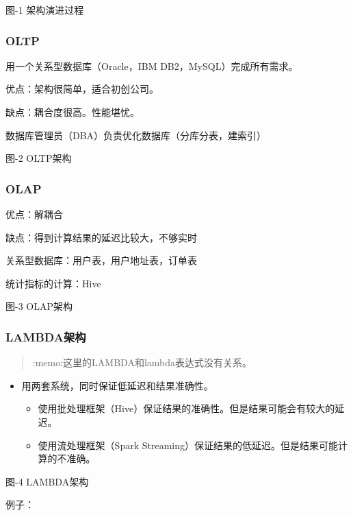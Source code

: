 图-1 架构演进过程

\hypertarget{oltp}{%
\subsubsection{OLTP}\label{oltp}}

用一个关系型数据库（Oracle，IBM DB2，MySQL）完成所有需求。

优点：架构很简单，适合初创公司。

缺点：耦合度很高。性能堪忧。

数据库管理员（DBA）负责优化数据库（分库分表，建索引）

图-2 OLTP架构

\hypertarget{olap}{%
\subsubsection{OLAP}\label{olap}}

优点：解耦合

缺点：得到计算结果的延迟比较大，不够实时

关系型数据库：用户表，用户地址表，订单表

统计指标的计算：Hive

图-3 OLAP架构

\hypertarget{lambdaux67b6ux6784}{%
\subsubsection{LAMBDA架构}\label{lambdaux67b6ux6784}}

\begin{quote}
:memo:这里的LAMBDA和lambda表达式没有关系。
\end{quote}

\begin{itemize}
\tightlist
\item
  用{两套}系统，同时保证低延迟和结果准确性。

  \begin{itemize}
  \tightlist
  \item
    使用批处理框架（Hive）保证结果的准确性。但是结果可能会有较大的延迟。
  \item
    使用流处理框架（Spark
    Streaming）保证结果的低延迟。但是结果可能计算的不准确。
  \end{itemize}
\end{itemize}

图-4 LAMBDA架构

例子：

